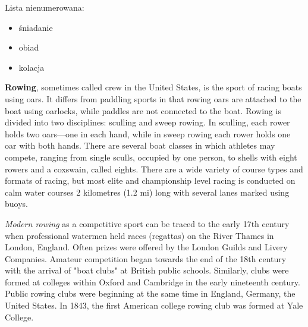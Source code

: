 Lista nienumerowana:
\begin{itemize}
    \item śniadanie
    \item obiad
    \item kolacja
\end{itemize}


\textbf{Rowing}, sometimes called crew in the United States, is the sport of racing boats using oars. It differs from paddling sports in that rowing oars are attached to the boat using oarlocks, while paddles are not connected to the boat. Rowing is divided into two disciplines: sculling and sweep rowing. In sculling, each rower holds two oars—one in each hand, while in sweep rowing each rower holds one oar with both hands. There are several boat classes in which athletes may compete, ranging from single sculls, occupied by one person, to shells with eight rowers and a coxswain, called eights. There are a wide variety of course types and formats of racing, but most elite and championship level racing is conducted on calm water courses 2 kilometres (1.2 mi) long with several lanes marked using buoys.

\textit{Modern rowing} as a competitive sport can be traced to the early 17th century when professional watermen held races (regattas) on the River Thames in London, England. Often prizes were offered by the London Guilds and Livery Companies. Amateur competition began towards the end of the 18th century with the arrival of "boat clubs" at British public schools. Similarly, clubs were formed at colleges within Oxford and Cambridge in the early nineteenth century. Public rowing clubs were beginning at the same time in England, Germany, the United States. In 1843, the first American college rowing club was formed at Yale College.